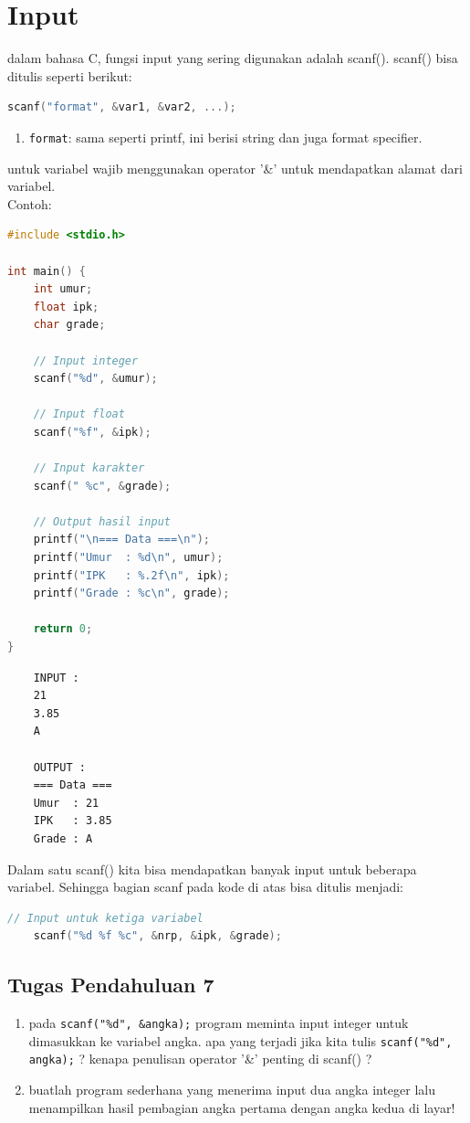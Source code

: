 \section{Input}

dalam bahasa C, fungsi input yang sering digunakan adalah scanf().
scanf() bisa ditulis seperti berikut:
{
\captionsetup[lstlisting]{labelformat=empty, justification=raggedright, singlelinecheck=false} %
\begin{lstlisting}[language=c, caption={syntax}]
	scanf("format", &var1, &var2, ...);
\end{lstlisting}
}
\begin{enumerate}[label={}, leftmargin=*]
	\item \verb|format|: sama seperti printf, ini berisi string dan juga format specifier.
\end{enumerate}
untuk variabel wajib menggunakan operator '\&' untuk mendapatkan alamat dari variabel.
\\ Contoh:
\begin{lstlisting}[language=c]
#include <stdio.h>

int main() {
	int umur;
	float ipk;
	char grade;

	// Input integer
	scanf("%d", &umur);

	// Input float
	scanf("%f", &ipk);

	// Input karakter
	scanf(" %c", &grade);

	// Output hasil input
	printf("\n=== Data ===\n");
	printf("Umur  : %d\n", umur);
	printf("IPK   : %.2f\n", ipk);
	printf("Grade : %c\n", grade);

	return 0;
}
\end{lstlisting}
\begin{verbatim}
	INPUT :
	21
	3.85
	A

	OUTPUT :
	=== Data ===
	Umur  : 21
	IPK   : 3.85
	Grade : A
\end{verbatim}
Dalam satu scanf() kita bisa mendapatkan banyak input untuk beberapa variabel.
Sehingga bagian scanf pada kode di atas bisa ditulis menjadi:
\begin{lstlisting}[language=c]
	// Input untuk ketiga variabel
	scanf("%d %f %c", &nrp, &ipk, &grade);
\end{lstlisting}

\subsection*{Tugas Pendahuluan 7}
\begin{enumerate}
	\item pada \verb|scanf("%d", &angka);| program meminta input integer untuk dimasukkan ke variabel angka.
     apa yang terjadi jika kita tulis \verb|scanf("%d", angka);| ? kenapa penulisan operator '\&' penting di scanf() ?
  	\item buatlah program sederhana yang menerima input dua angka integer lalu menampilkan hasil pembagian angka pertama dengan angka kedua di layar!
\end{enumerate}